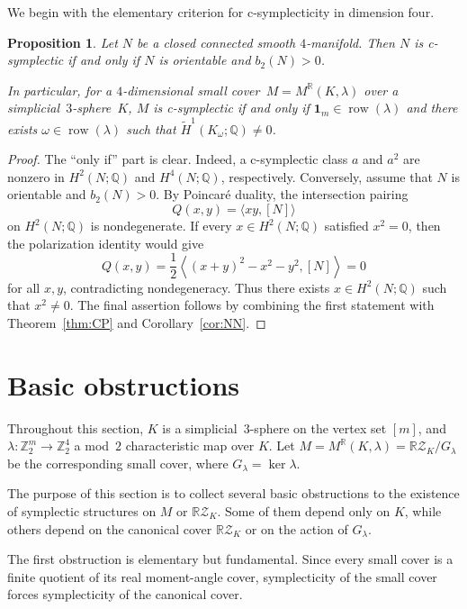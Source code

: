 \documentclass{amsart}
\newtheorem{proposition}[theorem]{Proposition}
\numberwithin{equation}{section}
\theoremstyle{definition}
\theoremstyle{remark}
\newcommand{\Z}{\mathbb Z}
\newcommand{\R}{\mathbb R}
\newcommand{\Q}{\mathbb Q}
\newcommand{\RZ}{\mathbb R\mathcal Z}
\newcommand{\one}{\mathbf 1}
\DeclareMathOperator{\row}{row}
\begin{document}
We begin with the elementary criterion for c-symplecticity in dimension four.

\begin{proposition}\label{prop-four-manifold-csymp}
    Let $N$ be a closed connected smooth $4$-manifold.
    Then $N$ is c-symplectic if and only if $N$ is orientable and $b_2(N)>0$.
    
    In particular, for a $4$-dimensional small cover~$M=M^\R(K,\lambda)$ over a simplicial~$3$-sphere~$K$, $M$ is c-symplectic if and only if  $\one_m \in \row(\lambda)$ and there exists $\omega\in\row(\lambda)$ such that $\widetilde H^1(K_\omega;\Q)\ne 0$.
\end{proposition}
\begin{proof}
    The ``only if'' part is clear.
    Indeed, a c-symplectic class $a$ and $a^2$ are nonzero in $H^2(N;\Q)$ and $H^4(N;\Q)$, respectively.
    Conversely, assume that $N$ is orientable and $b_2(N)>0$.
    By Poincar\'e duality, the intersection pairing
    $$
        Q(x,y)=\langle xy,[N]\rangle
    $$
    on $H^2(N;\Q)$ is nondegenerate.
    If every $x\in H^2(N;\Q)$ satisfied $x^2=0$, then the polarization identity would give
    $$
        Q(x,y) = \frac12\left\langle (x+y)^2-x^2-y^2,[N]\right\rangle=0
    $$
    for all $x,y$, contradicting nondegeneracy.
    Thus there exists $x\in H^2(N;\Q)$ such that $x^2\ne 0$.
    The final assertion follows by combining the first statement with Theorem~\ref{thm:CP} and Corollary~\ref{cor:NN}.
\end{proof}


\section{Basic obstructions} \label{sec-basic_obstructions}
Throughout this section, $K$ is a simplicial~$3$-sphere on the vertex set $[m]$, and $\lambda \colon \Z_2^m \to \Z_2^4$ a mod~$2$ characteristic map over $K$.
Let $M = M^\R(K,\lambda) = \RZ_K/{G_\lambda}$ be the corresponding small cover, where $G_\lambda=\ker\lambda$.

The purpose of this section is to collect several basic obstructions to the existence of symplectic structures on $M$ or $\RZ_K$.
Some of them depend only on $K$, while others depend on the canonical cover $\RZ_K$ or on the action of $G_\lambda$.

The first obstruction is elementary but fundamental.
Since every small cover is a finite quotient of its real moment-angle cover, symplecticity of the small cover forces symplecticity of the canonical cover.
\end{document}
